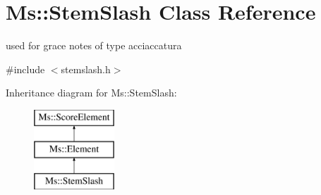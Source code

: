\hypertarget{class_ms_1_1_stem_slash}{}\section{Ms\+:\+:Stem\+Slash Class Reference}
\label{class_ms_1_1_stem_slash}


used for grace notes of type acciaccatura  




{\ttfamily \#include $<$stemslash.\+h$>$}

Inheritance diagram for Ms\+:\+:Stem\+Slash\+:\begin{figure}[H]
\begin{center}
\leavevmode
\includegraphics[height=3.000000cm]{class_ms_1_1_stem_slash}
\end{center}
\end{figure}
